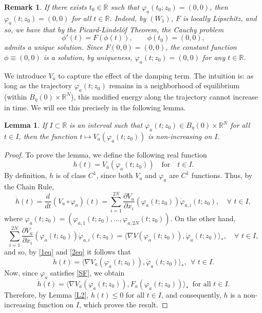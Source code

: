 \documentclass[12pt]{amsart}
\numberwithin{equation}{section}
\newtheorem{lemma}[theorem]{Lemma}
\newtheorem{remark}[theorem]{Remark}
\begin{document}
\begin{remark}\label{OBS2} \rm
If there exists $t_0\in\mathbb{R}$ such that $\varphi_a(t_0;z_0)=(0,0)$, then $\varphi_a(t;z_0)=(0,0)$ for all $t\in \mathbb{R}$. Indeed, by \hyperlink{W1}{$(W_1)$}, $F$ is locally Lipschitz, and so, we have that by the Picard-Lindelöf Theorem, the Cauchy problem
$$
\phi'(t)=F(\phi(t)),\qquad \phi(t_0)=(0,0),
$$
admits a unique solution. Since $F(0,0)=(0,0)$, the constant function $\phi\equiv(0,0)$ is a solution, by uniqueness, $\varphi_a(t;z_0)=(0,0)$ for any $t\in \mathbb{R}$.
\end{remark}

We introduce $V_a$ to capture the effect of the damping term. The intuition is: as long as the trajectory $\varphi_a(t;z_0)$ remains in a neighborhood of equilibrium (within $B_\eta(0)\times\mathbb{R}^N$), this modified energy along the trajectory cannot increase in time. We will see this precisely in the following lemma.

\begin{lemma}\label{L4}
	If $I\subset\mathbb{R}$ is an interval such that $\varphi_a(t;z_0)\in B_\eta(0)\times \mathbb{R}^N$ for all $t\in I$, then the function $t\mapsto V_a(\varphi_a(t;z_0))$ is non-increasing on $I$.
\end{lemma}
\begin{proof}
To prove the lemma, we define the following real function 
$$
h(t) = V_a(\varphi_a(t;z_0)) \quad\text{for}\quad t \in I.
$$ 
By definition, $h$ is of class $C^1$, since both $V_a$ and $\varphi_a$ are $C^1$ functions. Thus, by the Chain Rule, 
\begin{equation}\label{1eq}
	\dot{h}(t)=\frac{d}{dt}(V_a\circ\varphi_a)(t)=\sum_{i=1}^{2N}\frac{\partial V_a}{\partial x_i}(\varphi_a(t;z_0)) \dot{\varphi}_{a,i}(t;z_0),\quad \forall\,\, t\in I,
\end{equation}
where $\varphi_a(t;z_0)=(\varphi_{a,1}(t;z_0),\dots,\varphi_{a,2N}(t;z_0))$. On the other hand, 
\begin{equation}\label{2eq}
	\sum_{i=1}^{2N}\frac{\partial V_a}{\partial x_i}(\varphi_a(t;z_0)) \dot{\varphi}_{a,i}(t;z_0)=\langle\nabla V(\varphi_a(t;z_0)),\dot{\varphi}_a(t;z_0)\rangle_*,\quad \forall\,\, t\in I,
\end{equation}
and so, by \eqref{1eq} and \eqref{2eq} it follows that
$$
\dot{h}(t)=\langle\nabla V_a(\varphi_a(t;z_0)),\dot{\varphi}_a(t;z_0)\rangle_*,~~\forall\,\, t\in I.
$$
Now, since $\varphi_a$ satisfies \eqref{SF}, we obtain 
\begin{equation}\label{4eq}
	\dot{h}(t)=\langle\nabla V_a(\varphi_a(t;z_0)),F_a(\varphi_a(t;z_0))\rangle_*\,\text{ for all } t\in I.
\end{equation}
	Therefore, by Lemma \ref{L2}, $\dot{h}(t)\leq 0$ for all $t\in I$, and consequently, $h$ is a non-increasing function on $I$, which proves the result.	
\end{proof}
\end{document}
